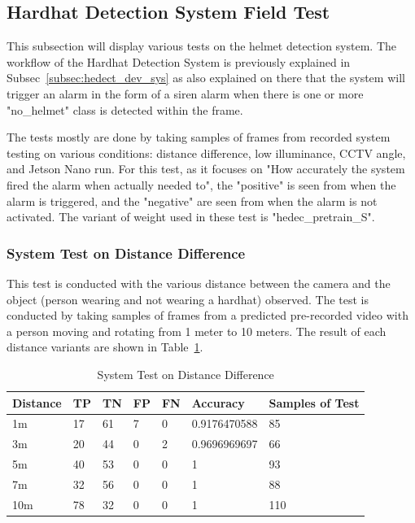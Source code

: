 \subsection{Hardhat Detection System Field Test}
\label{subsec:hedect_sys_test}

\par This subsection will display various tests on the helmet detection system. The workflow of the Hardhat Detection System is previously explained in Subsec~\ref{subsec:hedect_dev_sys} as also explained on there that the system will trigger an alarm in the form of a siren alarm when there is one or more "no\_helmet" class is detected within the frame. 

\par The tests mostly are done by taking samples of frames from recorded system testing on various conditions: distance difference, low illuminance, CCTV angle, and Jetson Nano run. For this test, as it focuses on "How accurately the system fired the alarm when actually needed to", the "positive" is seen from when the alarm is triggered, and the "negative" are seen from when the alarm is not activated. The variant of weight used in these test is "hedec\_pretrain\_S".

\subsubsection{System Test on Distance Difference}
\label{subsubsec:hedect_test_dist}

\par This test is conducted with the various distance between the camera and the object (person wearing and not wearing a hardhat) observed. The test is conducted by taking samples of frames from a predicted pre-recorded video with a person moving and rotating from 1 meter to 10 meters. The result of each distance variants are shown in Table~\ref{tb:systest_dist_test}.

\begin{table}
  \centering
  \caption{System Test on Distance Difference}
  \label{tb:systest_dist_test}
  \begin{tabular}{|l|l|l|l|l|l|l|} 
  \hline
  Distance & TP & TN & FP & FN & Accuracy     & Samples of Test  \\ 
  \hline
  1m       & 17 & 61 & 7  & 0  & 0.9176470588 & 85               \\ 
  \hline
  3m       & 20 & 44 & 0  & 2  & 0.9696969697 & 66               \\ 
  \hline
  5m       & 40 & 53 & 0  & 0  & 1            & 93               \\ 
  \hline
  7m       & 32 & 56 & 0  & 0  & 1            & 88               \\ 
  \hline
  10m      & 78 & 32 & 0  & 0  & 1            & 110              \\
  \hline
  \end{tabular}
\end{table}


